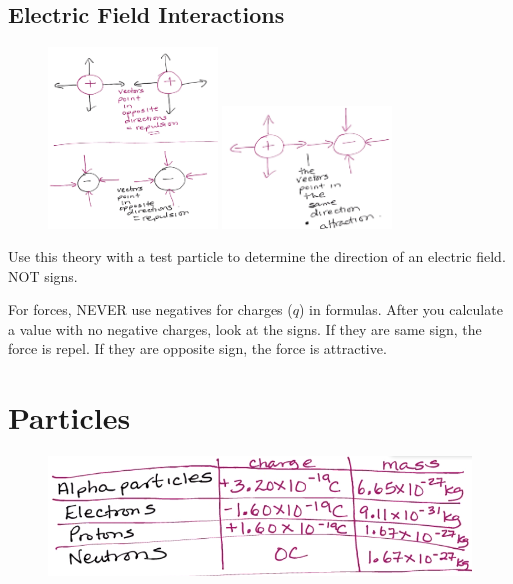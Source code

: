 \documentclass[a4paper,12pt]{article}
\begin{document}
\subsection{Electric Field Interactions}
\begin{figure}[H]
    \centering
    \includegraphics[width=0.4\textwidth]{repel}
    \includegraphics[width=0.4\textwidth]{attract}
\end{figure}

Use this theory with a test particle to determine the direction of an electric field. NOT signs.

For forces, NEVER use negatives for charges ($q$) in formulas. After you calculate a value with no negative charges, look at the signs. If they are same sign, the force is repel. If they are opposite sign, the force is attractive.

\section{Particles}
\begin{figure}[H]
    \centering
    \includegraphics[width=\textwidth]{particles}
\end{figure}
\end{document}
